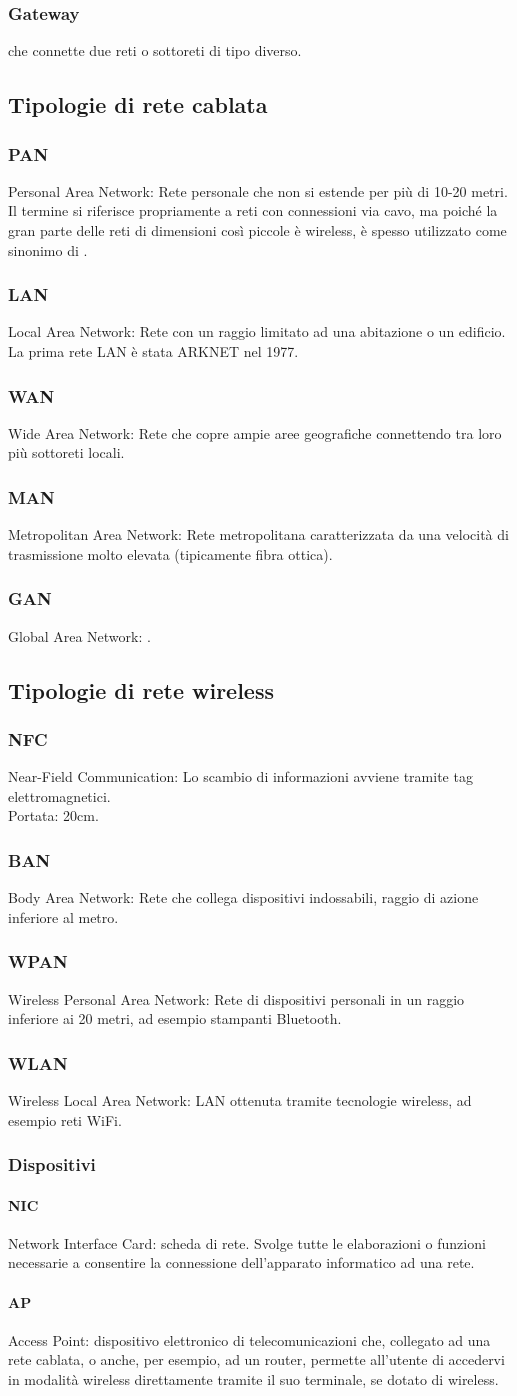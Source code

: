 \documentclass[a4paper, twoside]{article}
\def\sub#1{\subsection{#1}\label{#1}}
\def\subsub#1{\subsubsection{#1}\label{#1}}
\def\para#1{\paragraph{#1}\label{#1}}
\def\vedi#1{\nameref{#1}}
\begin{document}
\subsub{Gateway} 
\vedi{Router} che connette due reti o sottoreti di tipo diverso.
\sub{Tipologie di rete cablata}
\subsub{PAN} Personal Area Network: Rete personale che non si estende per più di 10-20 metri. Il termine si riferisce propriamente a reti con connessioni via cavo, ma poiché la gran parte delle reti di dimensioni così piccole è wireless, è spesso utilizzato come sinonimo di \vedi{WPAN}. 
\subsub{LAN} Local Area Network: Rete con un raggio limitato ad una abitazione o un edificio. La prima rete LAN è stata ARKNET nel 1977. 
\subsub{WAN} Wide Area Network: Rete che copre ampie aree geografiche connettendo tra loro più sottoreti locali. 
\subsub{MAN} Metropolitan Area Network: Rete metropolitana caratterizzata da una velocità di trasmissione molto elevata (tipicamente fibra ottica).
\subsub{GAN} Global Area Network: \vedi{Internet}.

\sub{Tipologie di rete wireless}
\subsub{NFC} Near-Field Communication: Lo scambio di informazioni avviene tramite tag elettromagnetici.\\ Portata: 20cm.
\subsub{BAN} Body Area Network: Rete che collega dispositivi indossabili, raggio di azione inferiore al metro.
\subsub{WPAN} Wireless Personal Area Network: Rete di dispositivi personali in un raggio inferiore ai 20 metri, ad esempio stampanti Bluetooth.
\subsub{WLAN} Wireless Local Area Network: LAN ottenuta tramite tecnologie wireless, ad esempio reti WiFi. 
\subsubsection{Dispositivi}
\para{NIC} Network Interface Card: scheda di rete. Svolge tutte le elaborazioni o funzioni necessarie a consentire la connessione dell'apparato informatico ad una rete.
\para{AP} Access Point:  dispositivo elettronico di telecomunicazioni che, collegato ad una rete cablata, o anche, per esempio, ad un router, permette all'utente di accedervi in modalità wireless direttamente tramite il suo terminale, se dotato di \vedi{NIC} wireless.
\end{document}
